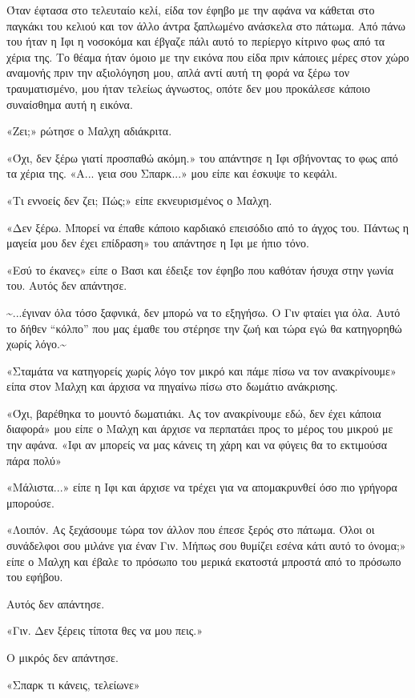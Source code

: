 \documentclass[12pt,twoside, openany]{book}
\begin{document}
Όταν έφτασα στο τελευταίο κελί, είδα τον έφηβο με την αφάνα να κάθεται στο παγκάκι του κελιού και τον άλλο άντρα ξαπλωμένο ανάσκελα στο πάτωμα. Από πάνω του ήταν η Ιφι η νοσοκόμα και έβγαζε πάλι αυτό το περίεργο κίτρινο φως από τα χέρια της. Το θέαμα ήταν όμοιο με την εικόνα που είδα πριν κάποιες μέρες στον χώρο αναμονής πριν την αξιολόγηση μου, απλά αντί αυτή τη φορά να ξέρω τον τραυματισμένο, μου ήταν τελείως άγνωστος, οπότε δεν μου προκάλεσε κάποιο συναίσθημα αυτή η εικόνα.

«Ζει;» ρώτησε ο Μαλχη αδιάκριτα.

«Όχι, δεν ξέρω γιατί προσπαθώ ακόμη.» του απάντησε η Ιφι σβήνοντας το φως από τα χέρια της. «Α... γεια σου Σπαρκ...» μου είπε και έσκυψε το κεφάλι.

«Τι εννοείς δεν ζει; Πώς;» είπε εκνευρισμένος ο Μαλχη.

«Δεν ξέρω. Μπορεί να έπαθε κάποιο καρδιακό επεισόδιο από το άγχος του. Πάντως η μαγεία μου δεν έχει επίδραση» του απάντησε η Ιφι με ήπιο τόνο.

«Εσύ το έκανες» είπε ο Βασι και έδειξε τον έφηβο που καθόταν ήσυχα στην γωνία του. Αυτός δεν απάντησε.

\textasciitilde ...έγιναν όλα τόσο ξαφνικά, δεν μπορώ να το εξηγήσω. Ο Γιν φταίει για όλα. Αυτό το δήθεν “κόλπο” που μας έμαθε του στέρησε την ζωή και τώρα εγώ θα κατηγορηθώ χωρίς λόγο.\textasciitilde 

«Σταμάτα να κατηγορείς χωρίς λόγο τον μικρό και πάμε πίσω να τον ανακρίνουμε» είπα στον Μαλχη και άρχισα να πηγαίνω πίσω στο δωμάτιο ανάκρισης.

«Όχι, βαρέθηκα το μουντό δωματιάκι. Ας τον ανακρίνουμε εδώ, δεν έχει κάποια διαφορά» μου είπε ο Μαλχη και άρχισε να περπατάει προς το μέρος του μικρού με την αφάνα. «Ιφι αν μπορείς να μας κάνεις τη χάρη και να φύγεις θα το εκτιμούσα πάρα πολύ»

«Μάλιστα...» είπε η Ιφι και άρχισε να τρέχει για να απομακρυνθεί όσο πιο γρήγορα μπορούσε.

«Λοιπόν. Ας ξεχάσουμε τώρα τον άλλον που έπεσε ξερός στο πάτωμα. Όλοι οι συνάδελφοι σου μιλάνε για έναν Γιν. Μήπως σου θυμίζει εσένα κάτι αυτό το όνομα;» είπε ο Μαλχη και έβαλε το πρόσωπο του μερικά εκατοστά μπροστά από το πρόσωπο του εφήβου.

Αυτός δεν απάντησε.

«Γιν. Δεν ξέρεις τίποτα θες να μου πεις.»

Ο μικρός δεν απάντησε.

«Σπαρκ τι κάνεις, τελείωνε»
\end{document}
